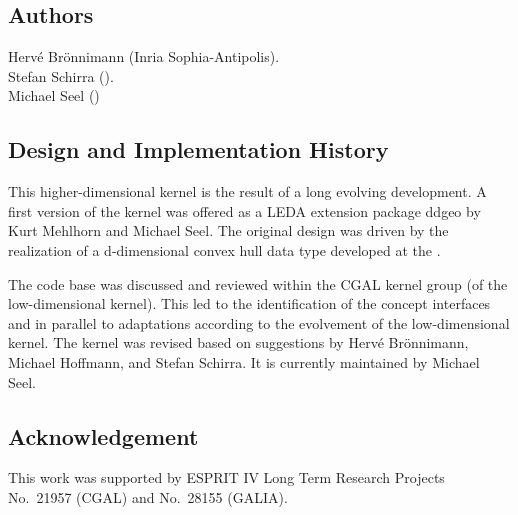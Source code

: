\subsection*{Authors}

Herv\'e Br\"onnimann ({\sc Inria} Sophia-Antipolis). \\
Stefan Schirra ().\\
Michael Seel ()

\subsection*{Design and Implementation History}

This higher-dimensional kernel is the result of a long evolving
development. A first version of the kernel was offered as a LEDA
extension package ddgeo by Kurt Mehlhorn and Michael Seel. The
original design was driven by the realization of a d-dimensional
convex hull data type developed at the 
.

The code base was discussed and reviewed within the CGAL kernel group
(of the low-dimensional kernel).  This led to the identification of
the concept interfaces and in parallel to adaptations according to the
evolvement of the low-dimensional kernel.  The kernel was revised
based on suggestions by Herv\'e Br\"onnimann, Michael Hoffmann, and
Stefan Schirra. It is currently maintained by Michael Seel.

\subsection*{Acknowledgement}

This work was supported by ESPRIT IV Long Term Research Projects
No.~21957 (CGAL) and No.~28155 (GALIA).


